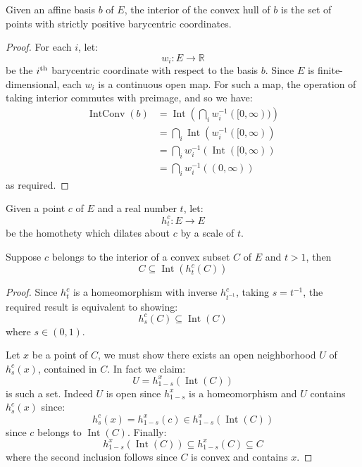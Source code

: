 \documentclass[10pt,a4paper]{article}
\newcommand{\co}{\!:}
\DeclareMathOperator{\Int}{Int} %
\DeclareMathOperator{\IntConv}{IntConv} %
\newcommand{\lean}[1]{}
\newcommand{\leanok}{}
\begin{document}
\begin{lemma}
  \label{lem:interior_chab}
  \lean{AffineBasis.interior_convexHull}\leanok
  Given an affine basis $b$ of $E$, the interior of the convex hull of
  $b$ is the set of points with strictly positive barycentric coordinates.
\end{lemma}

\begin{proof}
  \leanok
  For each $i$, let:
  \[
    w_i \co E \to ℝ
  \]
  be the $i^{\rm th}$ barycentric coordinate with respect to the basis $b$.
  Since $E$ is finite-dimensional, each $w_i$ is a continuous open map. For
  such a map, the operation of taking interior commutes with preimage, and so
  we have:
  \begin{align*}
    \IntConv(b) &= \Int\left(\bigcap_i w_i^{-1}([0, \infty))\right)\\
                &= \bigcap_i \Int(w_i^{-1}([0, \infty))\\
                &= \bigcap_i w_i^{-1}(\Int([0, \infty))\\
                &= \bigcap_i w_i^{-1}((0, \infty))
  \end{align*}
  as required.
\end{proof}

\begin{lemma}
  \label{lem:int_homothety_cvx}
  \lean{Convex.subset_interior_image_homothety_of_one_lt}\leanok
  Given a point $c$ of $E$ and a real number $t$, let:
  \[
    h^c_t \co E \to E
  \]
  be the homothety which dilates about $c$ by a scale of $t$.

  Suppose $c$ belongs to the interior of a convex subset $C$ of $E$
  and $t > 1$, then
  \[
    C \subseteq \Int(h^c_t(C))
  \]
\end{lemma}

\begin{proof}
  \leanok
  Since $h^c_t$ is a homeomorphism with inverse $h^c_{t^{-1}}$, taking $s = t^{-1}$,
  the required result is equivalent to showing:
  \[
    h^c_s(C) \subseteq \Int(C)
  \]
  where $s \in (0, 1)$.

  Let $x$ be a point of $C$, we must show there exists an open neighborhood $U$
  of $h^c_s(x)$, contained in $C$. In fact we claim:
  \[
    U = h^x_{1-s}(\Int(C))
  \]
  is such a set. Indeed $U$ is open since $h^x_{1-s}$ is a homeomorphism and $U$
  contains $h^c_s(x)$ since:
  \[
    h^c_s(x) = h^x_{1-s}(c) \in h^x_{1-s}(\Int(C))
  \]
  since $c$ belongs to $\Int(C)$. Finally:
  \[
    h^x_{1-s}(\Int(C)) \subseteq h^x_{1-s}(C) \subseteq C
  \]
  where the second inclusion follows since $C$ is convex and contains $x$.
\end{proof}
\end{document}
